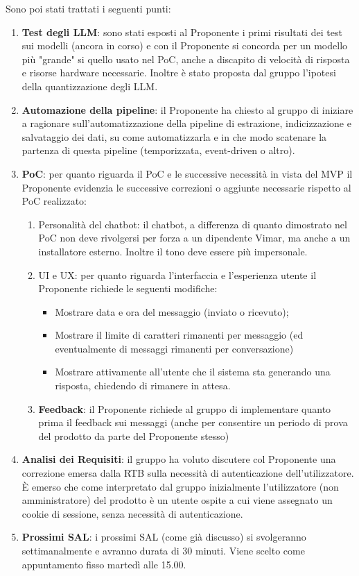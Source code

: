  
\noindent Sono poi stati trattati i seguenti punti:
\begin{enumerate}
    \item \textbf{Test degli LLM}: sono stati esposti al Proponente i primi risultati dei test sui modelli (ancora in corso) e con il Proponente si concorda per un modello più "grande" si quello usato nel PoC, anche a discapito di velocità di risposta e risorse hardware necessarie. Inoltre è stato proposta dal gruppo l'ipotesi della quantizzazione degli LLM.
    \item \textbf{Automazione della pipeline}: il Proponente ha chiesto al gruppo di iniziare a ragionare sull'automatizzazione della pipeline di estrazione, indicizzazione e salvataggio dei dati, su come automatizzarla e in che modo scatenare la partenza di questa pipeline (temporizzata, event-driven o altro).
    \item \textbf{PoC}: per quanto riguarda il PoC e le successive necessità in vista del MVP il Proponente evidenzia le successive correzioni o aggiunte necessarie rispetto al PoC realizzato:
        \begin{enumerate}
            \item Personalità del chatbot: il chatbot, a differenza di quanto dimostrato nel PoC non deve rivolgersi per forza a un dipendente Vimar, ma anche a un installatore esterno. Inoltre il tono deve essere più impersonale.
            \item UI e UX: per quanto riguarda l'interfaccia e l'esperienza utente il Proponente richiede le seguenti modifiche:
                \begin{itemize}
                \item Mostrare data e ora del messaggio (inviato o ricevuto);
                \item Mostrare il limite di caratteri rimanenti per messaggio (ed eventualmente di messaggi rimanenti per conversazione)
                \item Mostrare attivamente all'utente che il sistema sta generando una risposta, chiedendo di rimanere in attesa.
                \end{itemize}
            \item \textbf{Feedback}: il Proponente richiede al gruppo di implementare quanto prima il feedback sui messaggi (anche per consentire un periodo di prova del prodotto da parte del Proponente stesso)
        \end{enumerate}
    \item \textbf{Analisi dei Requisiti}: il gruppo ha voluto discutere col Proponente una correzione emersa dalla RTB sulla necessità di autenticazione dell'utilizzatore. È emerso che come interpretato dal gruppo inizialmente l'utilizzatore (non amministratore) del prodotto è un utente ospite a cui viene assegnato un cookie di sessione, senza necessità di autenticazione.
    \item \textbf{Prossimi SAL}: i prossimi SAL (come già discusso) si svolgeranno settimanalmente e avranno durata di 30 minuti. Viene scelto come appuntamento fisso martedì alle 15.00.
\end{enumerate}
